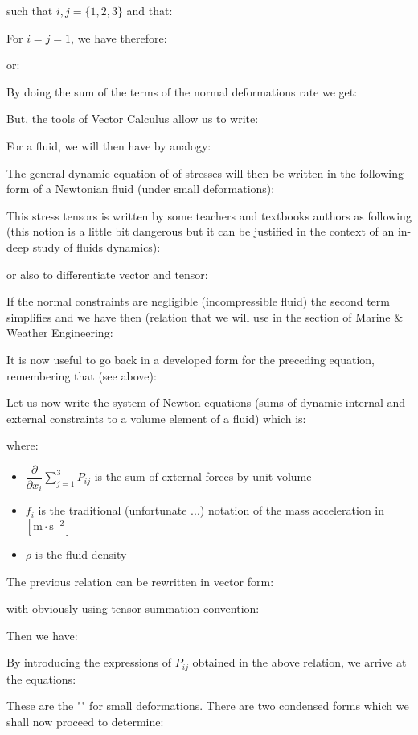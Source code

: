 	such that $i,j=\{1,2,3\}$ and that:
	
	For $i=j=1$, we have therefore:
	
	or:
	
	
	By doing the sum of the terms of the normal deformations rate we get:
	
	But, the tools of Vector Calculus allow us to write:
	
	For a fluid, we will then have by analogy:
	
	The general dynamic equation of of stresses will then be written in the following form of a Newtonian fluid (under small deformations):
	
	This stress tensors is written by some teachers and textbooks authors as following (this notion is a little bit dangerous but it can be justified in the context of an in-deep study of fluids dynamics):
	
	or also to differentiate vector and tensor:
	
	If the normal constraints are negligible (incompressible fluid) the second term simplifies and we have then (relation that we will use in the section of Marine \& Weather Engineering:
	
	It is now useful to go back in a developed form for the preceding equation, remembering that (see above):
	
	Let us now write the system of Newton equations (sums of dynamic internal and external constraints to a volume element of a fluid) which is:
	
	where:
	\begin{itemize}
		\item $\dfrac{\partial}{\partial x_i}\sum_{j=1}^3 P_{ij}$ is the sum of external forces by unit volume
		
		\item $f_i$ is the traditional (unfortunate ...) notation of the mass acceleration in $[\text{m}\cdot \text{s}^{-2}]$

		\item $\rho$ is the fluid density
	\end{itemize}
	The previous relation can be rewritten in vector form:
	
	with obviously using tensor summation convention:
	
	Then we have:
	
	By introducing the expressions of $P_{ij}$ obtained in the above relation, we arrive at the equations:
	
	These are the "" for small deformations. There are two condensed forms which we shall now proceed to determine:

